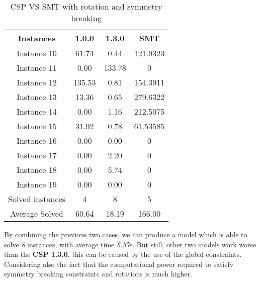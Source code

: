 \begin{table}[!h]
    \centering
    \begin{tabular}{|c|c|c|c|}\hline
        Instances          & 1.0.0    & 1.3.0    & SMT  \\ \hline
        Instance 10        & 61.74    & 0.44     & 121.9323  \\ \hline
        Instance 11        & 0.00     & 133.78   & 0    \\ \hline
        Instance 12        & 135.53   & 0.81     & 154.3911  \\ \hline
        Instance 13        & 13.36    & 0.65     & 279.6322  \\ \hline
        Instance 14        & 0.00     & 1.16     & 212.5075  \\ \hline
        Instance 15        & 31.92    & 0.78     & 61.53585  \\ \hline
        Instance 16        & 0.00     & 0.00     & 0    \\ \hline
        Instance 17        & 0.00     & 2.20     & 0    \\ \hline
        Instance 18        & 0.00     & 5.74     & 0    \\ \hline
        Instance 19        & 0.00     & 0.00     & 0    \\ \hline
        Solved   instances &  4  &  8 &  5  \\ \hline
        Average   Solved   &  60.64 &  18.19 &  166.00 \\ \hline
    \end{tabular}
    \caption{CSP VS SMT with rotation and symmetry breaking}
    \label{tab:csp-smt-with-rot-sym-comparison}
\end{table}
By combining the previous two cases, we can produce a model which is able to solve \textit{8} instances, with average time \textit{6.57}s. But still, other two models work worse than the \textbf{CSP 1.3.0}, this can be caused by the use of the global constraints. \\
Considering also the fact that the computational power required to satisfy symmetry breaking constraints and rotations is much higher. 
\clearpage
